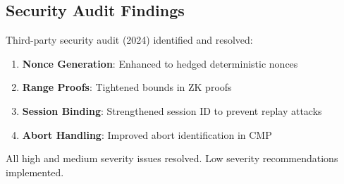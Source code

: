 \subsection{Security Audit Findings}

Third-party security audit (2024) identified and resolved:
\begin{enumerate}
\item \textbf{Nonce Generation}: Enhanced to hedged deterministic nonces
\item \textbf{Range Proofs}: Tightened bounds in ZK proofs
\item \textbf{Session Binding}: Strengthened session ID to prevent replay attacks
\item \textbf{Abort Handling}: Improved abort identification in CMP
\end{enumerate}

All high and medium severity issues resolved. Low severity recommendations implemented.

